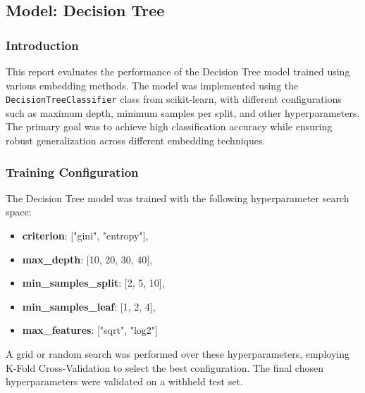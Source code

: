 \subsection{Model: Decision Tree}

\subsubsection{Introduction}
This report evaluates the performance of the Decision Tree model trained using various embedding methods. The model was implemented using the \texttt{DecisionTreeClassifier} class from scikit-learn, with different configurations such as maximum depth, minimum samples per split, and other hyperparameters. The primary goal was to achieve high classification accuracy while ensuring robust generalization across different embedding techniques.

\subsubsection{Training Configuration}

The Decision Tree model was trained with the following hyperparameter search space:

\begin{itemize}
    \item \textbf{criterion}:  ["gini", "entropy"],
    \item \textbf{max\_depth}: [10, 20, 30, 40],
    \item \textbf{min\_samples\_split}: [2, 5, 10],
    \item \textbf{min\_samples\_leaf}: [1, 2, 4],
    \item \textbf{max\_features}: ["sqrt", "log2"]
\end{itemize}


A grid or random search was performed over these hyperparameters, employing K-Fold Cross-Validation to select the best configuration. The final chosen hyperparameters were validated on a withheld test set.

